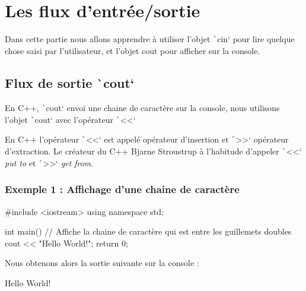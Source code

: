 \documentclass[10pt]{article}
\begin{document}
\section{Les flux d'entrée/sortie}
Dans cette partie nous allons apprendre à utiliser l'objet \texttt`cin` pour lire quelque chose saisi par l'utilisateur, et l'objet cout pour afficher sur la console.

\subsection{Flux de sortie \texttt`cout`}
En C++, \texttt`cout` envoi une chaine de caractère sur la console, nous utilisons l'objet \texttt`cout` avec l'opérateur \texttt`<<`

\begin{noteblock}
    En C++ l'opérateur \texttt`<<` est appelé opérateur d'insertion et \texttt`>>` opérateur d'extraction. Le créateur du C++ Bjarne Stroustrup à l'habitude d'appeler \texttt`<<` \textit{put to} et \texttt`>>` \textit{get from}.  
\end{noteblock}

\subsubsection{Exemple 1 : Affichage d'une chaine de caractère}
\begin{cppcode}
    #include <iostream>
    using namespace std;

    int main() {
        // Affiche la chaine de caractère qui est entre les guillemets doubles
        cout << "Hello World!";
        return 0;
    }
\end{cppcode}

\bigskip
Nous obtenons alors la sortie suivante sur la console :

\begin{textcode}
    Hello World!
\end{textcode}
\end{document}
